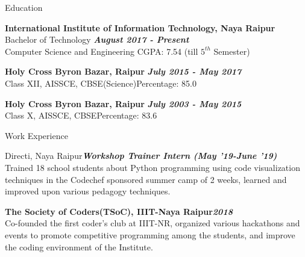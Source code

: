 \documentclass{resume} %
\begin{document}
\newcommand\myshade{85}
\vspace{-0.4cm}
\begin{rSection}{Education}

{\bf International Institute of Information Technology, Naya Raipur}  \\
Bachelor of Technology \hfill {\em \textbf{August 2017 - Present}}
\\
Computer Science and Engineering \hfill{CGPA: 7.54 (till $5^{th}$ Semester) }

\vspace{-0.15cm}
{\bf Holy Cross Byron Bazar, Raipur} \hfill {\em \textbf{July 2015 - May 2017}} \\
Class XII, AISSCE, CBSE(Science)\hfill {Percentage: 85.0} 

\vspace{-0.15cm}
{\bf Holy Cross Byron Bazar, Raipur} \hfill {\em \textbf{July 2003 - May 2015}} \\ 
Class X, AISSCE, CBSE\hfill {Percentage: 83.6}
\end{rSection}
\vspace{-0.3cm}
\begin{rSection}{Work Experience}

\begin{rSubsection}{Directi, Naya Raipur}{\textbf{\textit{Workshop Trainer Intern (May '19-June '19)}}}{}\\
\vspace{-0.4em}
Trained 18 school students about Python programming using code visualization techniques in the Codechef sponsored summer camp of 2 weeks, learned and improved upon various pedagogy techniques.

{\textbf{The Society of Coders(TSoC), IIIT-Naya Raipur}}\hfill{\textbf{\textit{2018}}}{}\\
Co-founded the first coder's club at IIIT-NR, organized various hackathons and events to promote competitive programming among the students, and improve the coding environment of the Institute.
\end{rSubsection}

\end{rSection}
\end{document}
